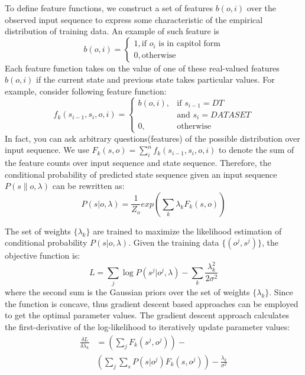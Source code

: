 \documentclass[10pt]{article}
\begin{document}
To define feature functions, we construct a set of features $b(o, i)$ over the observed input sequence to express some characteristic of the empirical distribution of training data. An example of such feature is\\
\[
	b(o, i) = 
	\begin{cases}
		1, \text{if $o_i$ is in capitol form} \\
		0, \text{otherwise}
	\end{cases}
\]
Each feature function takes on the value of one of these real-valued features $b(o, i)$ if the current state and previous state takes particular values. For example, consider following feature function:
\[
	f_k(s_{i-1}, s_i, o, i) = 
	\begin{cases}
		b(o, i), &\text{if $s_{i-1} = DT$} \\
			  & \text{and $s_{i} = DATASET$}\\
		0,	   &\text{otherwise}
	\end{cases}
\]
In fact, you can ask arbitrary questions(features) of the possible distribution over input sequence. We use $F_k(s, o) = \sum_{i}^n f_{k}(s_{i-1}, s_{i}, o, i)$ to denote the sum of the feature counts over input sequence and state sequence. Therefore, the conditional probability of predicted state sequence given an input sequence $P(s \| o, \lambda)$ can be rewritten as:
\[
	P(s | o, \lambda) = \frac{1}{Z_o} exp \left( \sum_{k} \lambda_{k} F_k(s, o) \right)
\]

The set of weights $\{ \lambda_k \}$ are trained to maximize the likelihood estimation of conditional probability $P(s | o, \lambda)$. Given the training data $\{(o^j, s^j)\}$, the objective function is:
\[
	L = \sum_{j} \log P(s^j | o^j, \lambda) -\sum_k \frac{\lambda_k^2}{2 \sigma^2} 
\]
where the second sum is the Gaussian priors over the set of weights $\{ \lambda_k \}$. Since the function is concave, thus gradient descent based approaches can be employed to get the optimal parameter values. The gradient descent approach calculates the first-derivative of the log-likelihood to iteratively update parameter values:
\begin{align*}
	\frac{\delta L}{\delta \lambda_k} & = \left( \sum_j F_k(s^j, o^j) \right) - \\
							& \left( \sum_j \sum_s P(s|o^j) F_k(s, o^j)\right) - \frac{\lambda_k}{\sigma^2} 
\end{align*}
\end{document}

